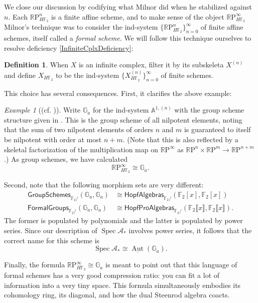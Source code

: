 \documentclass{article}
\newcommand{\F}{\mathbb F}
\newcommand{\G}{\mathbb G}
\newcommand{\R}{\mathbb R}
\newcommand{\RP}{\R\mathrm P}
\newcommand{\<}{\langle}
\renewcommand{\>}{\rangle}
\newcommand{\CatOf}[1]{\mathsf{#1}}
\DeclareMathOperator{\Spec}{Spec}
\DeclareMathOperator{\Aut}{Aut}
\numberwithin{equation}{section}
\theoremstyle{plain}
\theoremstyle{definition}
\newtheorem{definition}[equation]{Definition}
\theoremstyle{remark}
\newtheorem{example}[equation]{Example}
\begin{document}
 We close our discussion by codifying what Milnor did when he stabilized against $n$.  Each $\RP^n_{H\F_2}$ is a finite affine scheme, and to make sense of the object $\RP^\infty_{H\F_2}$ Milnor's technique was to consider the ind-system $\{\RP^n_{H\F_2}\}_{n=0}^\infty$ of finite affine schemes, itself called a \textit{formal scheme}.  We will follow this technique ourselves to resolve deficiency \ref{InfiniteCplxDeficiency}:
\begin{definition}
When $X$ is an infinite complex, filter it by its subskeleta $X^{(n)}$ and define $X_{H\F_2}$ to be the ind-system $\{X^{(n)}_{H\F_2}\}_{n=0}^\infty$ of finite schemes.
\end{definition}
\noindent This choice has several consequences.  First, it clarifies the above example:
\begin{example}[{(cf. )}]\label{RPinftyExampleForReal}
Write $\G_a$ for the ind-system $\mathbb A^{1, (n)}$ with the group scheme structure given in .  This is the group scheme of all nilpotent elements, noting that the sum of two nilpotent elements of orders $n$ and $m$ is guaranteed to itself be nilpotent with order at most $n+m$.  (Note that this is also reflected by a skeletal factorization of the multiplication map on $\RP^\infty$ as $\RP^n \times \RP^m \to \RP^{n+m}$.)  As group schemes, we have calculated \[\RP^\infty_{H\F_2} \cong \G_a.\]
\end{example}
\noindent Second, note that the following morphism sets are very different:
\begin{align*}
\CatOf{GroupSchemes}_{\F_2/}(\mathbb G_a, \mathbb G_a) & \cong \CatOf{HopfAlgebras}_{\F_2/}(\F_2[x], \F_2[x]) \\
\CatOf{FormalGroups}_{\F_2/}(\G_a, \G_a) & \cong \CatOf{HopfProAlgebras}_{\F_2/}(\F_2\llbracket x \rrbracket, \F_2\llbracket x \rrbracket).
\end{align*}
The former is populated by polynomials and the latter is populated by power series.  Since our description of $\Spec \mathcal A_*$ involves power series, it follows that the correct name for this scheme is \[\Spec \mathcal A_* \cong \underline{\Aut}(\G_a).\]

Finally, the formula $\RP^\infty_{H\F_2} \cong \G_a$ is meant to point out that this language of formal schemes has a very good compression ratio: you can fit a lot of information into a very tiny space.  This formula simultaneously embodies its cohomology ring, its diagonal, and how the dual Steenrod algebra coacts.
\end{document}
